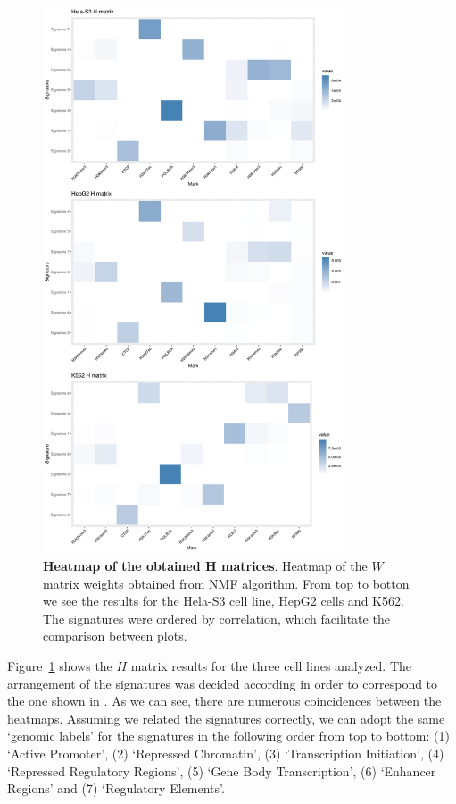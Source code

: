 \begin{figure}[h!]
    \centering
    \includegraphics[width=0.8\textwidth]{Figures/NMF/vert_comb.png}
    \caption[Heatmap of the obtained H matrices]{\textbf{Heatmap of the obtained H matrices}. Heatmap of the \(W\) matrix weights obtained from NMF algorithm. From top to botton we see the results for the Hela-S3 cell line, HepG2 cells and K562. The signatures were ordered by correlation, which facilitate the comparison between plots.}
    \label{fig:H_heatmaps}
\end{figure}

Figure~\ref{fig:H_heatmaps} shows the \(H\) matrix results for the three cell lines analyzed. The arrangement of the signatures was decided according in order to correspond to the one shown in \cite{Gandolfi2017}. As we can see, there are numerous coincidences between the heatmaps. Assuming we related the signatures correctly, we can adopt the same `genomic labels' for the signatures in the following order from top to bottom: (1) `Active Promoter', (2) `Repressed Chromatin', (3) `Transcription Initiation', (4) `Repressed Regulatory Regions', (5) `Gene Body Transcription',  (6) `Enhancer Regions' and (7) `Regulatory Elements'.

